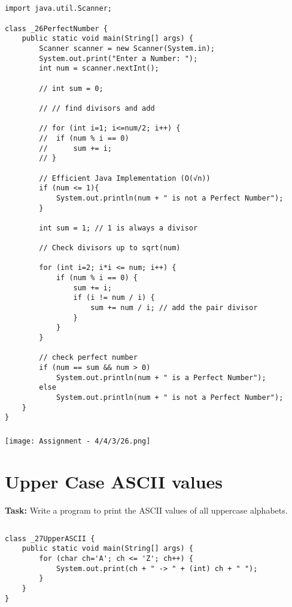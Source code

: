 \documentclass[12pt,a4paper]{article}
\begin{document}
\subsection{}
\begin{lstlisting}
import java.util.Scanner;

class _26PerfectNumber {
    public static void main(String[] args) {
        Scanner scanner = new Scanner(System.in);
        System.out.print("Enter a Number: ");
        int num = scanner.nextInt();
    
        // int sum = 0;
        
        // // find divisors and add
    
        // for (int i=1; i<=num/2; i++) {
        // 	if (num % i == 0) 
        // 		sum += i;
        // }
    
        // Efficient Java Implementation (O(√n))
        if (num <= 1){
            System.out.println(num + " is not a Perfect Number");
        }
    
        int sum = 1; // 1 is always a divisor
    
        // Check divisors up to sqrt(num)
    
        for (int i=2; i*i <= num; i++) {
            if (num % i == 0) {
                sum += i;
                if (i != num / i) {
                    sum += num / i; // add the pair divisor
                }
            }
        }
    
        // check perfect number
        if (num == sum && num > 0)
            System.out.println(num + " is a Perfect Number");
        else 
            System.out.println(num + " is not a Perfect Number");
    }
}
\end{lstlisting}

\subsubsection{}
\begin{center}
    \texttt{[image: Assignment - 4/4/3/26.png]}
\end{center}


\section{Upper Case ASCII values}
\textbf{Task:} Write a program to print the ASCII values of all uppercase alphabets.

\subsection{}
\begin{lstlisting}
class _27UpperASCII {
    public static void main(String[] args) {
        for (char ch='A'; ch <= 'Z'; ch++) {
            System.out.print(ch + " -> " + (int) ch + " ");
        }
    }
}
\end{lstlisting}
\end{document}
